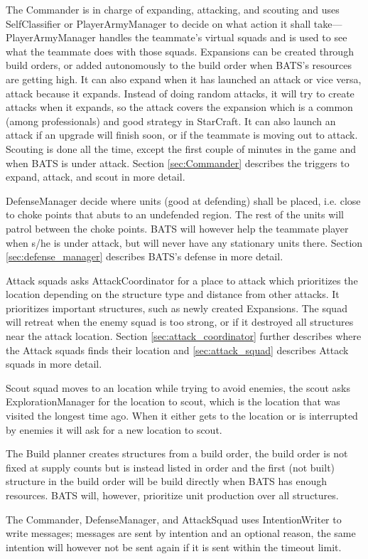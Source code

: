 The Commander is in charge of expanding, attacking, and scouting and uses SelfClassifier or
PlayerArmyManager to decide on what action it shall take—
PlayerArmyManager handles the teammate's
virtual squads and is used to see what the teammate does with those squads. Expansions can be created through
build orders, or added autonomously to the build order when BATS's resources are getting high. It
can also expand when it has launched an attack or vice versa, attack because it expands. Instead of
doing random attacks, it will try to create attacks when it expands, so the attack covers the
expansion which is a common (among professionals) and good strategy in StarCraft\cite{day9}. It can
also launch an attack if an upgrade will finish soon, or if the teammate is moving out to attack.
Scouting is done all the time, except the first couple of minutes in the game and when BATS is under
attack. Section \ref{sec:Commander}  describes the triggers to expand,
attack, and scout in more detail.

DefenseManager decide where units (good at defending) shall be placed, i.e. close to choke points
that abuts to an undefended region. The rest of the units will patrol between the choke points. BATS
will however help the teammate player when s/he is under attack, but will never have any stationary
units there. Section \ref{sec:defense_manager}  describes BATS's
defense in more detail.

Attack squads asks AttackCoordinator for a place to attack which prioritizes the location depending on the structure type and distance from other
attacks. It prioritizes important structures, such as newly created Expansions. The squad will
retreat when the enemy squad is too strong, or if it destroyed all structures near the attack
location. Section \ref{sec:attack_coordinator}  further describes
where the Attack squads finds their location and \ref{sec:attack_squad} 
describes Attack squads in more detail.

Scout squad moves to an location while trying to avoid enemies, the scout asks ExplorationManager
for the location to scout, which is the location that was visited the longest time ago. When it
either gets to the location or is interrupted by enemies it will ask for a new location to scout.

The Build planner creates structures from a build order, the build order is not fixed at
supply counts but is instead listed in order and the first (not built) structure in the build order
will be build directly when BATS has enough resources. BATS will, however, prioritize unit
production over all structures.

The Commander, DefenseManager, and AttackSquad uses IntentionWriter to
write messages; messages are sent by intention and an optional reason, the same intention will
however not be sent again if it is sent within the timeout limit.

